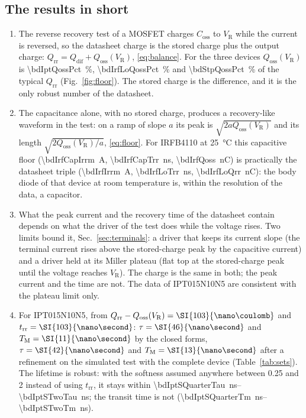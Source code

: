 \documentclass[10pt,a4paper]{scrartcl}
\newcommand{\VR}{V_\mathrm{R}}
\newcommand{\Qrr}{Q_\mathrm{rr}}
\newcommand{\Qdif}{Q_\mathrm{dif}}
\newcommand{\Qoss}{Q_\mathrm{oss}}
\newcommand{\Coss}{C_\mathrm{oss}}
\newcommand{\trr}{t_\mathrm{rr}}
\newcommand{\TM}{T_\mathrm{M}}
\newcommand{\IPT}{IPT015N10N5}
\newcommand{\IRF}{IRFB4110}
\begin{document}
\subsection*{The results in short}
\begin{enumerate}
\item The reverse recovery test of a MOSFET charges $\Coss$ to $\VR$ while the current is reversed, so the datasheet charge is the stored charge plus the output charge: $\Qrr = \Qdif + \Qoss(\VR)$, \eqref{eq:balance}. For the three devices $\Qoss(\VR)$ is \SI{\bdIptQossPct}{\percent}, \SI{\bdIrfLoQossPct}{\percent} and \SI{\bdStpQossPct}{\percent} of the typical $\Qrr$ (Fig.~\ref{fig:floor}). The stored charge is the difference, and it is the only robust number of the datasheet.
\item The capacitance alone, with no stored charge, produces a recovery-like waveform in the test: on a ramp of slope $a$ its peak is $\sqrt{2a\Qoss(\VR)}$ and its length $\sqrt{2\Qoss(\VR)/a}$, \eqref{eq:floor}. For \IRF{} at \SI{25}{\celsius} this capacitive floor (\SI{\bdIrfCapIrrm}{\ampere}, \SI{\bdIrfCapTrr}{\nano\second}, \SI{\bdIrfQoss}{\nano\coulomb}) is practically the datasheet triple (\SI{\bdIrfIrrm}{\ampere}, \SI{\bdIrfLoTrr}{\nano\second}, \SI{\bdIrfLoQrr}{\nano\coulomb}): the body diode of that device at room temperature is, within the resolution of the data, a capacitor.
\item What the peak current and the recovery time of the datasheet contain depends on what the driver of the test does while the voltage rises. Two limits bound it, Sec.~\ref{sec:terminals}: a driver that keeps its current slope (the terminal current rises above the stored-charge peak by the capacitive current) and a driver held at its Miller plateau (flat top at the stored-charge peak until the voltage reaches $\VR$). The charge is the same in both; the peak current and the time are not. The data of \IPT{} are consistent with the plateau limit only.
\item For \IPT{}, from $\Qrr - \Qoss(\VR) = \SI{\bdIptQdif}{\nano\coulomb}$ and $\trr = \SI{\bdIptTrr}{\nano\second}$: $\tau = \SI{\bdIptTau}{\nano\second}$ and $\TM = \SI{\bdIptTm}{\nano\second}$ by the closed forms, $\tau = \SI{\bdIptRefTau}{\nano\second}$ and $\TM = \SI{\bdIptRefTm}{\nano\second}$ after a refinement on the simulated test with the complete device (Table~\ref{tab:sets}). The lifetime is robust: with the softness assumed anywhere between 0.25 and 2 instead of using $\trr$, it stays within \SIrange{\bdIptSQuarterTau}{\bdIptSTwoTau}{\nano\second}; the transit time is not (\SIrange{\bdIptSQuarterTm}{\bdIptSTwoTm}{\nano\second}).

\end{enumerate}
\end{document}
